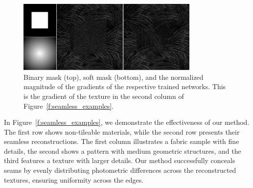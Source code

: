 \begin{figure}[h]
    \centering
    \includegraphics[width=0.80\textwidth]{img/ch6/gradients-merged.png}
    \caption{Binary mask (top), soft mask (bottom), and the normalized magnitude of the gradients of the respective trained networks. This is the gradient of the texture in the second column of Figure~\ref{f:seamless_examples}.}
    \label{f:training_masks}
\end{figure}

In Figure~\ref{f:seamless_examples}, we demonstrate the effectiveness of our method. The first row shows non-tileable materials, while the second row presents their seamless reconstructions. The first column illustrates a fabric sample with fine details, the second shows a pattern with medium geometric structures, and the third features a texture with larger details. Our method successfully conceals seams by evenly distributing photometric differences across the reconstructed textures, ensuring uniformity across the edges.


